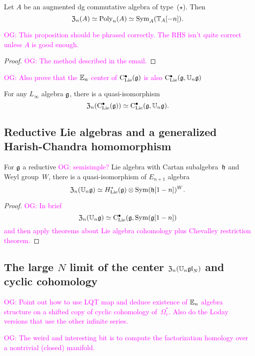 \documentclass[11pt]{amsart}
\numberwithin{equation}{section}
\def\owen{\textcolor{magenta}{OG: }\textcolor{magenta}}
\begin{document}
\begin{prp}
Let $A$ be an augmented dg commutative algebra of type~($\star$).
Then 
\[
{\frak Z}_n(A) \simeq {\rm Poly}_n(A) \simeq {\rm Sym}_A(\mathbb T_A[-n]).
\]
\end{prp}

\owen{This proposition should be phrased correctly. The RHS isn't quite correct unless $A$ is good enough.}

\begin{proof}
\owen{The method described in the email.}
\end{proof}

\owen{Also prove that the $\mathbb E_n$ center of ${\rm C}_{\rm Lie}^\bullet(\mathfrak g)$ is also ${\rm C}_{\rm Lie}^\bullet(\mathfrak g, \mathbb U_n \mathfrak g)$}

\begin{cor}
\label{cor: koszul dual to main theorem}
For any $L_\infty$ algebra $\mathfrak g$,
there is a quasi-isomorphism
\[
{\frak Z}_n({\rm C}_{\rm Lie}^\bullet(\mathfrak g)) \simeq {\rm C}_{\rm Lie}^\bullet(\mathfrak g, \mathbb U_n \mathfrak g).
\]
\end{cor}

\subsection{Reductive Lie algebras and a generalized Harish-Chandra homomorphism}

\begin{prp}
For $\mathfrak g$ a reductive \owen{semisimple?} Lie algebra with Cartan subalgebra~$\mathfrak h$ and Weyl group~$W$, 
there is a quasi-isomorphism of $E_{n+1}$ algebra
\[
{\frak Z}_n(\mathbb U_n \mathfrak g) \simeq H^*_{\rm Lie}(\mathfrak g) \otimes {\rm Sym}(\mathfrak h[1-n])^W.
\]
\end{prp}

\begin{proof}
\owen{In brief
\[
{\frak Z}_n(\mathbb U_n \mathfrak g) \simeq {\rm C}_{\rm Lie}^\bullet(\mathfrak g, {\rm Sym}(\mathfrak g[1-n])
\]
and then apply theorems about Lie algebra cohomology plus Chevalley restriction theorem.}
\end{proof}

\subsection{The large $N$ limit of the center ${\frak Z}_n(\mathbb U_n \frak{gl}_N)$ and cyclic cohomology}

\owen{Point out how to use LQT map and deduce existence of $\mathbb E_n$ algebra structure on a shifted copy of cyclic cohomology of~$\Omega^*_c$. Also do the Loday versions that use the other infinite series.}

\owen{The weird and interesting bit is to compute the factorization homology over a nontrivial (closed) manifold.}
\end{document}
